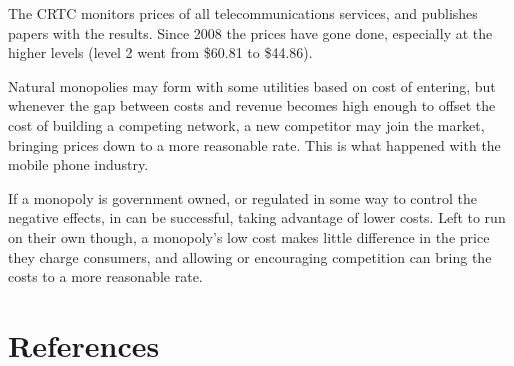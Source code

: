 \documentclass{article}
\begin{document}
The CRTC monitors prices of all telecommunications services, and publishes papers with the results. Since 2008 the prices have gone done, especially at the higher levels (level 2 went from \$60.81 to \$44.86).\cite{priceComp}

Natural monopolies may form with some utilities based on cost of entering, but whenever the gap between costs and revenue becomes high enough to offset the cost of building a competing network, a new competitor may join the market, bringing prices down to a more reasonable rate. This is what happened with the mobile phone industry.

If a monopoly is government owned, or regulated in some way to control the negative effects, in can be successful, taking advantage of lower costs. Left to run on their own though, a monopoly's low cost makes little difference in the price they charge consumers, and allowing or encouraging competition can bring the costs to a more reasonable rate.

\section{References}
\end{document}
